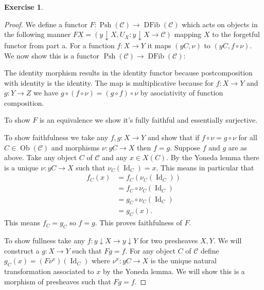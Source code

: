 \documentclass{article}
\DeclareMathOperator{\Id}{Id}
\newcommand{\cat}{\mathcal{C}}
\DeclareMathOperator{\objects}{Ob}
\DeclareMathOperator{\psh}{Psh}
\DeclareMathOperator{\dfib}{DFib}
\theoremstyle{definition}
\newtheorem{question}{Exercise}
\begin{document}
\begin{question}
\begin{enumerate}[(a)]
              \begin{proof}
                  We define a functor \(F:\psh(\cat)\to\dfib(\cat)\) which acts
                  on objects in the following manner \(FX=(y\downarrow
                  X,U_{X}:y\downarrow X\to\cat)\) mapping \(X\) to the forgetful
                  functor from part a. For a function \(f:X\to Y\) it maps
                  \((yC,\nu)\) to \((yC,f\circ\nu)\). We now show this is a
                  functor \(\psh(\cat)\to\dfib(\cat)\):

                  The identity morphism results in the identity functor because
                  postcomposition with identity is the identity. The map is
                  multiplicative because for \(f:X\to Y\) and \(g:Y\to Z\) we
                  have \(g\circ(f\circ\nu)=(g\circ f)\circ\nu\) by asociativity
                  of function composition.

                  To show \(F\) is an equivalence we show it's fully faithful
                  and essentially surjective.

                  To show faithfulness we take any \(f,g:X\to Y\) and show that
                  if \(f\circ\nu=g\circ\nu\) for all \(C\in\objects(\cat)\) and
                  morphisms \(\nu:yC\to X\) then \(f=g\). Suppose \(f\) and
                  \(g\) are as above. Take any object \(C\) of \(\cat\) and any
                  \(x\in X(C)\). By the Yoneda lemma there is a unique
                  \(\nu:yC\to X\) such that \(\nu_{C}(\Id_{C})=x\). This means
                  in particular that
                  \begin{align*}
                      f_{C}(x) & =f_{C}(\nu_{C}(\Id_{C}))    \\
                               & =f_{C}\circ\nu_{C}(\Id_{C}) \\
                               & =g_{C}\circ\nu_{C}(\Id_{C}) \\
                               & =g_{C}(x).
                  \end{align*}
                  This means \(f_{C}=g_{C}\) so \(f=g\). This proves
                  faithfulness of \(F\).

                  To show fullness take any \(f:y\downarrow X\to y\downarrow Y\)
                  for two presheaves \(X,Y\). We will construct a \(g:X\to Y\)
                  such that \(Fg=f\). For any object \(C\) of \(\cat\) define
                  \(g_{C}(x)=(F\nu^{x})(\Id_{C})\) where \(\nu^{x}:yC\to X\) is
                  the unique natural transformation associated to \(x\) by the
                  Yoneda lemma. We will show this is a morphism of presheaves
                  such that \(Fg=f\).


\end{proof}
\end{enumerate}
\end{question}
\end{document}

